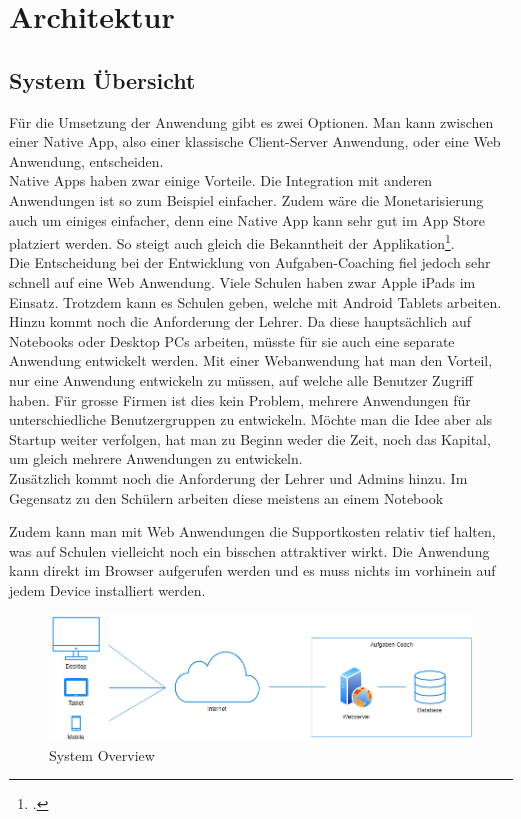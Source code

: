 \section{Architektur}
\subsection{System Übersicht}
Für die Umsetzung der Anwendung gibt es zwei Optionen. Man kann zwischen einer Native App, also einer klassische Client-Server Anwendung, oder eine Web Anwendung, entscheiden. \\

Native Apps haben zwar einige Vorteile. Die Integration mit anderen Anwendungen ist so zum Beispiel einfacher. Zudem wäre die Monetarisierung auch um einiges einfacher, denn eine Native App kann sehr gut im App Store platziert werden. So steigt auch gleich die Bekanntheit der Applikation\footcite{native_app}. \\

Die Entscheidung bei der Entwicklung von Aufgaben-Coaching fiel jedoch sehr schnell auf eine Web Anwendung. Viele Schulen haben zwar Apple iPads im Einsatz. Trotzdem kann es Schulen geben, welche mit Android Tablets arbeiten. Hinzu kommt noch die Anforderung der Lehrer. Da diese hauptsächlich auf Notebooks oder Desktop PCs arbeiten, müsste für sie auch eine separate Anwendung entwickelt werden. Mit einer Webanwendung hat man den Vorteil, nur eine Anwendung entwickeln zu müssen, auf welche alle Benutzer Zugriff haben. Für grosse Firmen ist dies kein Problem, mehrere Anwendungen für unterschiedliche Benutzergruppen zu entwickeln. Möchte man die Idee aber als Startup weiter verfolgen, hat man zu Beginn weder die Zeit, noch das Kapital, um gleich mehrere Anwendungen zu entwickeln. \\

Zusätzlich kommt noch die Anforderung der Lehrer und Admins hinzu. Im Gegensatz zu den Schülern arbeiten diese meistens an einem Notebook

Zudem kann man mit Web Anwendungen die Supportkosten relativ tief halten, was auf Schulen vielleicht noch ein bisschen attraktiver wirkt. Die Anwendung kann direkt im Browser aufgerufen werden und es muss nichts im vorhinein auf jedem Device installiert werden.

\begin{figure}[H]
\begin{center}
	\includegraphics[width=\textwidth, keepaspectratio]{images/system_overview.png}
	\caption{System Overview}
	\label{fig:system_overview}
\end{center}
\end{figure}
